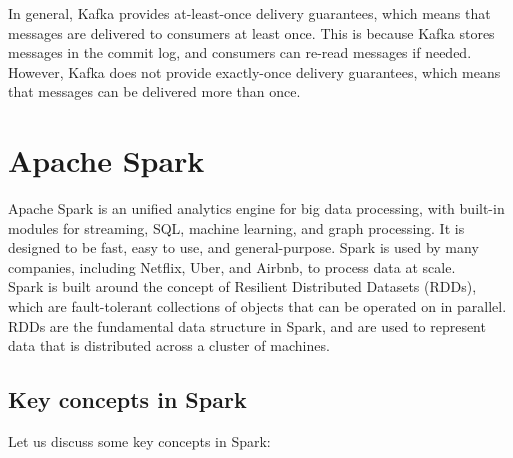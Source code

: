 In general, Kafka provides at-least-once delivery guarantees, which means that messages are delivered
to consumers at least once. This is because Kafka stores messages in the commit log, and consumers can
re-read messages if needed. However, Kafka does not provide exactly-once delivery guarantees,
which means that messages can be delivered more than once.

\section{Apache Spark}

Apache Spark is an unified analytics engine for big data processing, with built-in modules for
streaming, SQL, machine learning, and graph processing. It is designed to be fast, easy to use, and
general-purpose. Spark is used by many companies, including Netflix, Uber, and Airbnb, to process
data at scale.\\

Spark is built around the concept of Resilient Distributed Datasets (RDDs), which are fault-tolerant
collections of objects that can be operated on in parallel. RDDs are the fundamental data structure
in Spark, and are used to represent data that is distributed across a cluster of machines.

\subsection{Key concepts in Spark}

Let us discuss some key concepts in Spark:

